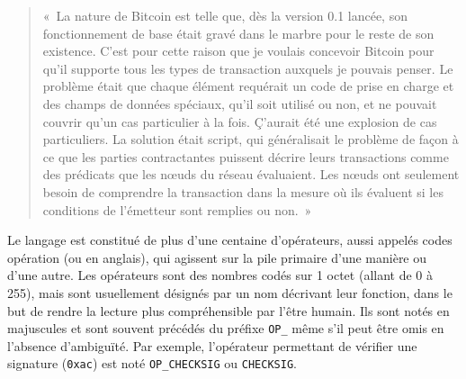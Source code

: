 \begin{quote}
«~La nature de Bitcoin est telle que, dès la version 0.1 lancée, son fonctionnement de base était gravé dans le marbre pour le reste de son existence. C'est pour cette raison que je voulais concevoir Bitcoin pour qu'il supporte tous les types de transaction auxquels je pouvais penser. Le problème était que chaque élément requérait un code de prise en charge et des champs de données spéciaux, qu'il soit utilisé ou non, et ne pouvait couvrir qu'un cas particulier à la fois. Ç'aurait été une explosion de cas particuliers. La solution était script, qui généralisait le problème de façon à ce que les parties contractantes puissent décrire leurs transactions comme des prédicats que les nœuds du réseau évaluaient. Les nœuds ont seulement besoin de comprendre la transaction dans la mesure où ils évaluent si les conditions de l'émetteur sont remplies ou non.~»
\end{quote} %

Le langage est constitué de plus d'une centaine d'opérateurs, aussi appelés codes opération (ou  en anglais), qui agissent sur la pile primaire d'une manière ou d'une autre. Les opérateurs sont des nombres codés sur 1 octet (allant de 0 à 255), mais sont usuellement désignés par un nom décrivant leur fonction, dans le but de rendre la lecture plus compréhensible par l'être humain. Ils sont notés en majuscules et sont souvent précédés du préfixe \texttt{OP\_} même s'il peut être omis en l'absence d'ambiguïté. Par exemple, l'opérateur permettant de vérifier une signature (\texttt{0xac}) est noté \texttt{OP\_CHECKSIG} ou \texttt{CHECKSIG}.

